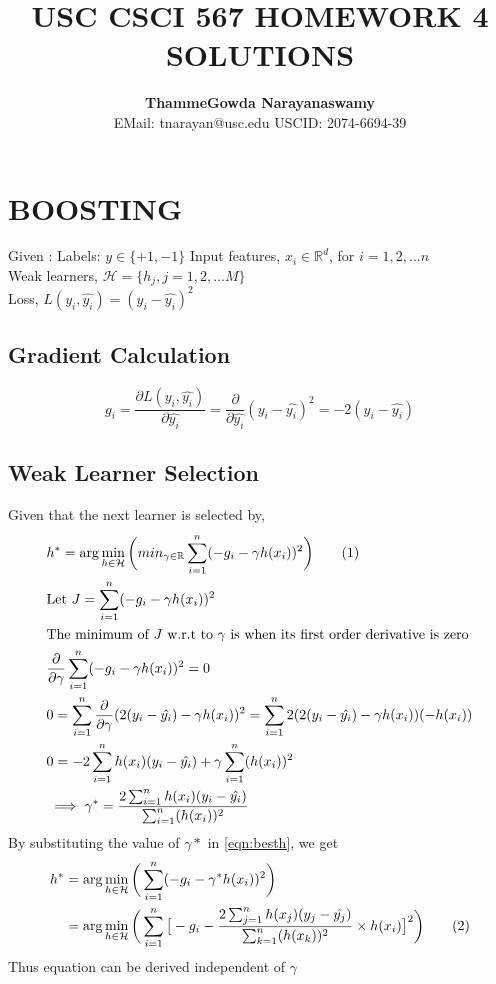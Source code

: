 \documentclass[letter,doc,notimes]{article}
\title{\noindent  \textbf{ USC CSCI 567 HOMEWORK 4 SOLUTIONS} }
\author{\textbf{ThammeGowda Narayanaswamy} \\
EMail: tnarayan@usc.edu  USCID: 2074-6694-39}
\newcommand\numberthis{\addtocounter{equation}{1}\tag{\theequation}}
\begin{document}
\maketitle

\section{ BOOSTING}
Given : \newline
Labels: $y \in \{+1, -1\}$  \newline
Input features, $x_i \in \mathbb{R}^d$,  for $i = 1, 2, ... n$ \\
Weak learners, $\mathcal{H} = \{h_j, j=1,2,... M \} $ \\
Loss, $L(y_i, \hat{y_i}) = (y_i - \hat{y_i})^2$


\subsection {Gradient Calculation}
\begin{equation}\label{eqn:gradient}
	g_i = \frac{\partial L(y_i, \hat{y_i})} {\partial \hat{y_i}} = \frac{\partial }{\partial \hat{y_i}} (y_i - \hat{y_i})^2 = -2 (y_i - \hat{y_i}) 
\end{equation}
\subsection {Weak Learner Selection}
Given that the next learner is selected by, \\
\begin{align*}
	& h^* =  \arg \min_{h\in\mathcal{H}} \bigg(min_{\gamma\in \mathbb{R}} \sum_{i=1}^{n} (-g_i - \gamma h(x_i))^2\bigg) \numberthis \label{eqn:besth}\\
	& \text{Let } J =  \sum_{i=1}^{n} (-g_i - \gamma h(x_i))^2 \\
	& \text{The minimum of $J$ w.r.t to $\gamma$ is when its first order derivative is zero} \\
	&\frac{\partial }{\partial \gamma} \sum_{i=1}^{n} (-g_i - \gamma h(x_i))^2= 0 \\
	& 0 = \sum_{i=1}^{n} \frac{\partial }{\partial \gamma}(2 (y_i - \hat{y_i}) - \gamma h(x_i))^2  = \sum_{i=1}^{n}  2 (2 (y_i - \hat{y_i}) - \gamma h(x_i)) ( - h(x_i)) \\
	& 0 = - 2\sum_{i=1}^{n} h(x_i)(y_i - \hat{y_i})  + \gamma  \sum_{i=1}^{n} (h(x_i))^2 \\
	& \implies \gamma^* = \frac{2\sum_{i=1}^{n} h(x_i)(y_i - \hat{y_i}) }{\sum_{i=1}^{n} (h(x_i))^2 }
\end{align*}
By substituting the value of $\gamma*$ in \ref{eqn:besth}, we get
\begin{align*}
	h^* &=  \arg \min_{h\in\mathcal{H}} \bigg(\sum_{i=1}^{n} (-g_i - \gamma^* h(x_i))^2\bigg)  \\
	& = \arg \min_{h\in\mathcal{H}} \bigg(\sum_{i=1}^{n} \big[-g_i - \frac{2\sum_{j=1}^{n} h(x_j)(y_j - \hat{y_j}) }{\sum_{k=1}^{n} (h(x_k))^2 } \times h(x_i)\big ]^2\bigg)  \numberthis \label{eqn:besth2}\\
\end{align*}
Thus equation  can be derived independent of $\gamma$
\end{document}
